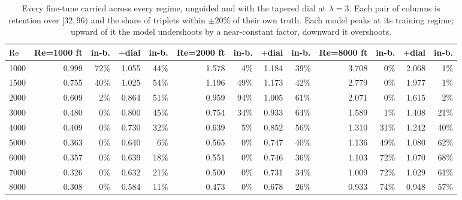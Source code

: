 \begin{table}[t]
  \centering
  \caption{Every fine-tune carried across every regime, unguided and with the tapered dial at $\lambda=3$. Each pair of columns is retention over $[32,96)$ and the share of triplets within $\pm20\%$ of their own truth. Each model peaks at its training regime; upward of it the model undershoots by a near-constant factor, downward it overshoots.}
  \label{tab:specialist-transfer}
  \begin{tabular}{lrrrrrrrrrrrr}
    \toprule
    $\mathrm{Re}$ & Re=1000 ft & in-b. & $+$dial & in-b. & Re=2000 ft & in-b. & $+$dial & in-b. & Re=8000 ft & in-b. & $+$dial & in-b. \\
    \midrule
    1000 & 0.999 & 72\% & 1.055 & 44\% & 1.578 & 4\% & 1.184 & 39\% & 3.708 & 0\% & 2.068 & 1\% \\
    1500 & 0.755 & 40\% & 1.025 & 54\% & 1.196 & 49\% & 1.173 & 42\% & 2.779 & 0\% & 1.977 & 1\% \\
    2000 & 0.609 & 2\% & 0.864 & 51\% & 0.959 & 94\% & 1.005 & 61\% & 2.071 & 0\% & 1.615 & 2\% \\
    3000 & 0.480 & 0\% & 0.800 & 45\% & 0.754 & 34\% & 0.933 & 64\% & 1.589 & 1\% & 1.408 & 21\% \\
    4000 & 0.409 & 0\% & 0.730 & 32\% & 0.639 & 5\% & 0.852 & 56\% & 1.310 & 31\% & 1.242 & 40\% \\
    5000 & 0.363 & 0\% & 0.640 & 6\% & 0.565 & 0\% & 0.747 & 40\% & 1.136 & 49\% & 1.080 & 62\% \\
    6000 & 0.357 & 0\% & 0.639 & 18\% & 0.551 & 0\% & 0.746 & 36\% & 1.103 & 72\% & 1.070 & 68\% \\
    7000 & 0.326 & 0\% & 0.632 & 21\% & 0.500 & 0\% & 0.731 & 34\% & 1.009 & 72\% & 1.029 & 61\% \\
    8000 & 0.308 & 0\% & 0.584 & 11\% & 0.473 & 0\% & 0.678 & 26\% & 0.933 & 74\% & 0.948 & 57\% \\
    \bottomrule
  \end{tabular}
\end{table}
